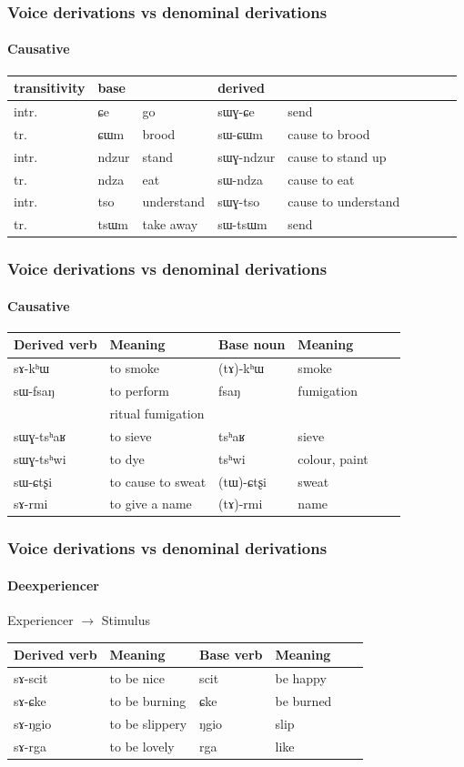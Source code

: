 \documentclass[xcolor=table]{beamer}
\newcommand{\ipa}[1]{{\phon \mbox{#1}}} %
\begin{document}
  \begin{frame} 
\frametitle{Voice derivations vs denominal derivations} 
\framesubtitle{Causative} 
 
 
\begin{tabular}{lllllllll} \toprule
 transitivity & base & & derived & \\
 \midrule
 intr. & \ipa{ɕe} & go & \ipa{sɯɣ-ɕe} & send \\
  tr. & \ipa{ɕɯm} & brood & \ipa{sɯ-ɕɯm} & cause to brood \\
  intr. & \ipa{ndzur} & stand & \ipa{sɯɣ-ndzur} & cause to stand up \\
  tr. & \ipa{ndza} & eat & \ipa{sɯ-ndza} & cause to eat \\ 
    intr. & \ipa{tso} & understand & \ipa{sɯɣ-tso} & cause to understand \\
  tr. & \ipa{tsɯm} & take away & \ipa{sɯ-tsɯm} &  send \\ 
 \bottomrule
\end{tabular}

\end{frame}    
 
   \begin{frame} 
\frametitle{Voice derivations vs denominal derivations} 
\framesubtitle{Causative} 
 
 
\begin{tabular}{llllll}
\toprule
  Derived verb& Meaning &Base noun  & Meaning \\
\midrule
\ipa{sɤ-kʰɯ} & to smoke& \ipa{(tɤ)-kʰɯ} & smoke\\
 \ipa{sɯ-fsaŋ} & to perform  & \ipa{fsaŋ} & fumigation \\
&ritual fumigation\\
\ipa{sɯɣ-tsʰaʁ} & to sieve & \ipa{tsʰaʁ} & sieve\\
\ipa{sɯɣ-tsʰwi} & to dye & \ipa{tsʰwi} & colour, paint\\
 \ipa{sɯ-ɕtʂi}& to cause to sweat & \ipa{(tɯ)-ɕtʂi} & sweat\\
 \ipa{sɤ-rmi} & to give a name & \ipa{(tɤ)-rmi} & name\\
\bottomrule
\end{tabular}
\end{frame}  

   \begin{frame} 
\frametitle{Voice derivations vs denominal derivations} 
\framesubtitle{Deexperiencer} 

Experiencer $\rightarrow$ Stimulus

\begin{tabular}{llllll}
\toprule
  Derived verb& Meaning &Base verb  & Meaning \\
\midrule
 \ipa{sɤ-scit} & to be nice & \ipa{scit} & be happy \\
 \ipa{sɤ-ɕke} & to be burning & \ipa{ɕke} & be burned \\
 \ipa{sɤ-ŋgio} & to be slippery & \ipa{ŋgio} & slip \\
 \ipa{sɤ-rga} & to be lovely & \ipa{rga} & like \\
\bottomrule
\end{tabular}
\end{frame}    
\end{document}
